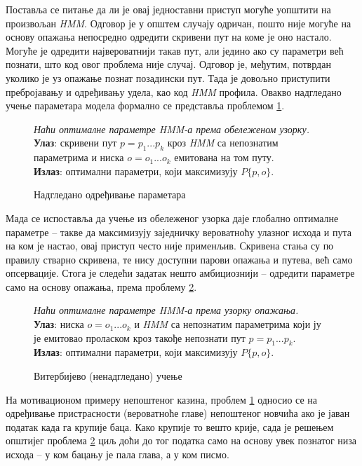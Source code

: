 \documentclass[12pt,oneside]{memoir}
\newenvironment{problem}[1][!ht]
{\renewcommand{\algorithmcfname}{Проблем}
\begin{figure}[!ht]
\centering
  \begin{minipage}{.94\linewidth}
	\begin{algorithm}[#1]%
  }{\end{algorithm}
  \end{minipage}
\end{figure}}
\begin{document}
\begin{CJK}{UTF8}{ipxm}
Поставља се питање да ли је овај једноставни приступ могуће уопштити на произвољан \textit{HMM}. Одговор је у општем случају одричан, пошто није могуће на основу опажања непосредно одредити скривени пут на коме је оно настало. Могуће је одредити највероватнији такав пут, али једино ако су параметри већ познати, што код овог проблема није случај. Одговор је, међутим, потврдан уколико је уз опажање познат позадински пут. Тада је довољно приступити пребројавању и одређивању удела, као код \textit{HMM} профила. Овакво надгледано учење параметара модела формално се представља проблемом \ref{prob:params}.

\begin{problem}[H]
  \SetAlgoLined
  \textit{Наћи оптималне параметре \textit{HMM}-а према обележеном узорку.}\\
  \textbf{Улаз}: скривени пут $p = p_1...p_k$ кроз \textit{HMM} са непознатим параметрима и ниска $o = o_1...o_k$ емитована на том путу.\\
  \textbf{Излаз}: оптимални параметри, који максимизују $P\{p, o\}$.
  \caption{Надгледано одређивање параметара\cite{ba10h}}
  \label{prob:params}
\end{problem}

Мада се испоставља да учење из обележеног узорка даје глобално оптималне параметре -- такве да максимизују заједничку вероватноћу улазног исхода и пута на ком је настао, овај приступ често није применљив. Скривена стања су по правилу стварно скривена, те нису доступни парови опажања и путева, већ само опсервације. Стога је следећи задатак нешто амбициознији -- одредити параметре само на основу опажања, према проблему \ref{prob:vituch}.

\begin{problem}[H]
  \SetAlgoLined
  \textit{Наћи оптималне параметре \textit{HMM}-а према узорку опажања.}\\
  \textbf{Улаз}: ниска $o = o_1...o_k$ и \textit{HMM} са непознатим параметрима који ју је емитовао проласком кроз такође непознати пут $p = p_1...p_k$.\\
  \textbf{Излаз}: оптимални параметри, који максимизују $P\{p, o\}$.
  \caption{Витербијево (ненадгледано) учење\cite{ba10i}}
  \label{prob:vituch}
\end{problem}

На мотивационом примеру непоштеног казина, проблем \ref{prob:params} односио се на одређивање пристрасности (вероватноће главе) непоштеног новчића ако је јаван податак када га крупије баца. Како крупије то вешто крије, сада је решењем општијег проблема \ref{prob:vituch} циљ доћи до тог податка само на основу увек познатог низа исхода -- у ком бацању је пала глава, а у ком писмо.


\end{CJK}
\end{document}

